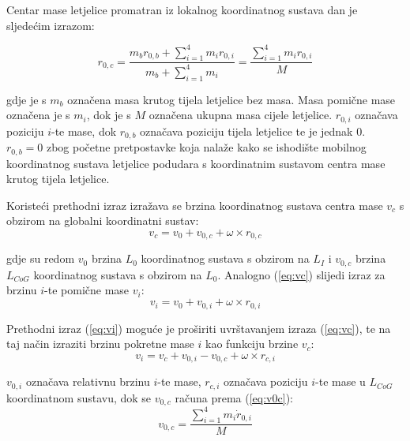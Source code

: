 \documentclass[11pt,a4paper]{article}
\begin{document}
\medskip

Centar mase letjelice promatran iz lokalnog koordinatnog sustava dan je sljedećim izrazom:

\begin{equation}
 {r}_{0,c} = \frac{ {m}_{b} {r}_{0,b} + \sum_{i=1}^{4}{m}_{i} {r}_{0,i}}{{m}_{b} + \sum_{i=1}^{4} {m}_{i}} = \frac{\sum_{i=1}^{4} {m}_{i} {r}_{0,i}}{ {M}}
\label{eq:r0c}
\end{equation}

\medskip

gdje je s $m_{b}$ označena masa krutog tijela letjelice bez masa. Masa pomične mase označena je s $m_{i}$, dok je s $M$ označena ukupna masa cijele letjelice. $r_{0,i}$ označava poziciju $i$-te mase, dok $r_{0,b}$ označava poziciju tijela letjelice te je jednak 0. $r_{0,b} = 0$ zbog početne pretpostavke koja nalaže kako se ishodište mobilnog koordinatnog sustava letjelice podudara s koordinatnim sustavom centra mase krutog tijela letjelice. 

\medskip

Koristeći prethodni izraz izražava se brzina koordinatnog sustava centra mase $v_{c}$ s obzirom na globalni koordinatni sustav:
\begin{equation}
 {v_{c} = v_{0} + v_{0,c} + \omega \times r_{0,c}}
\label{eq:vc}
\end{equation}

gdje su redom $v_{0}$ brzina $L_{0}$ koordinatnog sustava s obzirom na $L_{I}$ i $v_{0,c}$ brzina $L_{CoG}$ koordinatnog sustava s obzirom na $L_{0}$. Analogno (\ref{eq:vc}) slijedi izraz za brzinu $i$-te pomične mase $v_{i}$:
\begin{equation}
 {v_{i} = v_{0} + v_{0,i} + \omega \times r_{0,i}}
\label{eq:vi}
\end{equation}

Prethodni izraz (\ref{eq:vi}) moguće je proširiti uvrštavanjem izraza (\ref{eq:vc}), te na taj način izraziti brzinu pokretne mase $i$ kao funkciju brzine $v_{c}$: 
\begin{equation}
 {v_{i} = v_{c} + v_{0,i} - v_{0,c} + \omega \times r_{c,i}}
\label{eq:vi2}
\end{equation}

$v_{0,i}$ označava relativnu brzinu $i$-te mase, $r_{c,i}$ označava poziciju $i$-te mase u $L_{CoG}$ koordinatnom sustavu, dok se $v_{0,c}$ računa prema (\ref{eq:v0c}):
\begin{equation}
 {v_{0,c} = \frac{\sum_{i=1}^{4}m_{i}\dot{r}_{0,i}}{M}}
\label{eq:v0c}
\end{equation}
\end{document}
